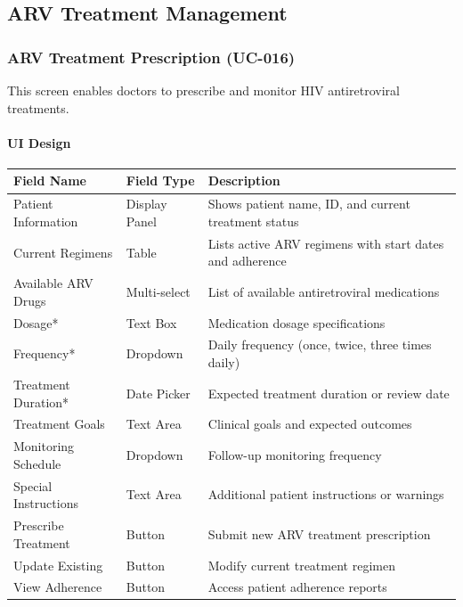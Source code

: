 \documentclass[12pt,a4paper]{article}
\begin{document}
\subsection{ARV Treatment Management}

\subsubsection{ARV Treatment Prescription (UC-016)}

This screen enables doctors to prescribe and monitor HIV antiretroviral treatments.

\paragraph{UI Design}

\begin{longtable}{|p{3cm}|p{3cm}|p{8cm}|}
\hline
\textbf{Field Name} & \textbf{Field Type} & \textbf{Description} \\
\hline
Patient Information & Display Panel & Shows patient name, ID, and current treatment status \\
\hline
Current Regimens & Table & Lists active ARV regimens with start dates and adherence \\
\hline
Available ARV Drugs & Multi-select & List of available antiretroviral medications \\
\hline
Dosage* & Text Box & Medication dosage specifications \\
\hline
Frequency* & Dropdown & Daily frequency (once, twice, three times daily) \\
\hline
Treatment Duration* & Date Picker & Expected treatment duration or review date \\
\hline
Treatment Goals & Text Area & Clinical goals and expected outcomes \\
\hline
Monitoring Schedule & Dropdown & Follow-up monitoring frequency \\
\hline
Special Instructions & Text Area & Additional patient instructions or warnings \\
\hline
Prescribe Treatment & Button & Submit new ARV treatment prescription \\
\hline
Update Existing & Button & Modify current treatment regimen \\
\hline
View Adherence & Button & Access patient adherence reports \\
\hline
\end{longtable}
\end{document}
